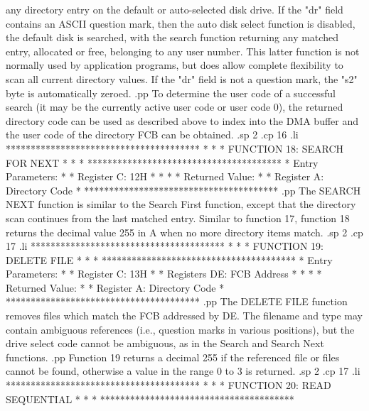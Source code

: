 any directory entry on
the default or auto-selected disk drive.
If the "dr" field contains an ASCII question mark, then the
auto disk select function is disabled, the default disk
is searched, with the search function returning any
matched entry, allocated or free, belonging to any user
number.  This latter function is not normally used by
application programs, but does allow complete flexibility
to scan all current directory values.
If the "dr" field is not a question mark, the "s2" byte is
automatically zeroed.
.pp
To determine the user code of a successful search (it may be the
currently active user code or user code 0), the returned directory
code can be used as described above to index into the DMA buffer
and the user code of the directory FCB can be obtained.
.sp 2
.cp 16
.li
***************************************
*                                     *
*  FUNCTION 18: SEARCH FOR NEXT       *
*                                     *
***************************************
*  Entry Parameters:                  *
*      Register   C:  12H             *
*                                     *
*  Returned   Value:                  *
*      Register   A:  Directory Code  *
***************************************
.pp
The SEARCH NEXT function is similar to the Search First function,
except that the directory scan continues from the last matched
entry.  Similar to function 17, function 18 returns the decimal
value 255 in A when no more directory items match.
.sp 2
.cp 17
.li
***************************************
*                                     *
*  FUNCTION 19: DELETE FILE           *
*                                     *
***************************************
*  Entry Parameters:                  *
*      Register   C:  13H             *
*      Registers DE:  FCB Address     *
*                                     *
*  Returned   Value:                  *
*      Register   A:  Directory Code  *
***************************************
.pp
The DELETE FILE function removes files which match the FCB
addressed by DE.  The filename and type may contain ambiguous
references (i.e., question marks in various positions), but
the drive select code cannot be ambiguous, as in the Search
and Search Next functions.
.pp
Function 19 returns a decimal 255 if the referenced file or
files cannot be found, otherwise a value in the range
0 to 3 is returned.
.sp 2
.cp 17
.li
***************************************
*                                     *
*  FUNCTION 20: READ SEQUENTIAL       *
*                                     *
***************************************
